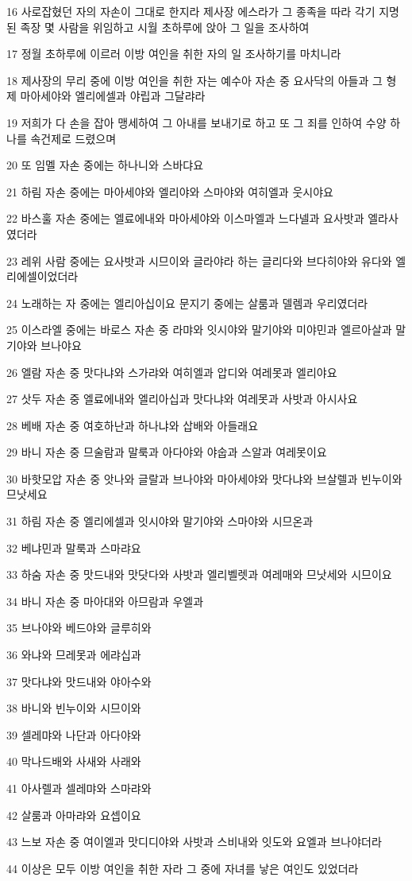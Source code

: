 \par 16 사로잡혔던 자의 자손이 그대로 한지라 제사장 에스라가 그 종족을 따라 각기 지명된 족장 몇 사람을 위임하고 시월 초하루에 앉아 그 일을 조사하여
\par 17 정월 초하루에 이르러 이방 여인을 취한 자의 일 조사하기를 마치니라
\par 18 제사장의 무리 중에 이방 여인을 취한 자는 예수아 자손 중 요사닥의 아들과 그 형제 마아세야와 엘리에셀과 야립과 그달랴라
\par 19 저희가 다 손을 잡아 맹세하여 그 아내를 보내기로 하고 또 그 죄를 인하여 수양 하나를 속건제로 드렸으며
\par 20 또 임멜 자손 중에는 하나니와 스바댜요
\par 21 하림 자손 중에는 마아세야와 엘리야와 스마야와 여히엘과 웃시야요
\par 22 바스훌 자손 중에는 엘료에내와 마아세야와 이스마엘과 느다넬과 요사밧과 엘라사였더라
\par 23 레위 사람 중에는 요사밧과 시므이와 글라야라 하는 글리다와 브다히야와 유다와 엘리에셀이었더라
\par 24 노래하는 자 중에는 엘리아십이요 문지기 중에는 살룸과 델렘과 우리였더라
\par 25 이스라엘 중에는 바로스 자손 중 라먀와 잇시야와 말기야와 미야민과 엘르아살과 말기야와 브나야요
\par 26 엘람 자손 중 맛다냐와 스가랴와 여히엘과 압디와 여레못과 엘리야요
\par 27 삿두 자손 중 엘료에내와 엘리아십과 맛다냐와 여레못과 사밧과 아시사요
\par 28 베배 자손 중 여호하난과 하나냐와 삽배와 아들래요
\par 29 바니 자손 중 므술람과 말룩과 아다야와 야숩과 스알과 여레못이요
\par 30 바핫모압 자손 중 앗나와 글랄과 브나야와 마아세야와 맛다냐와 브살렐과 빈누이와 므낫세요
\par 31 하림 자손 중 엘리에셀과 잇시야와 말기야와 스마야와 시므온과
\par 32 베냐민과 말룩과 스마랴요
\par 33 하숨 자손 중 맛드내와 맛닷다와 사밧과 엘리벨렛과 여레매와 므낫세와 시므이요
\par 34 바니 자손 중 마아대와 아므람과 우엘과
\par 35 브나야와 베드야와 글루히와
\par 36 와냐와 므레못과 에랴십과
\par 37 맛다냐와 맛드내와 야아수와
\par 38 바니와 빈누이와 시므이와
\par 39 셀레먀와 나단과 아다야와
\par 40 막나드배와 사새와 사래와
\par 41 아사렐과 셀레먀와 스마랴와
\par 42 살룸과 아마랴와 요셉이요
\par 43 느보 자손 중 여이엘과 맛디디야와 사밧과 스비내와 잇도와 요엘과 브나야더라
\par 44 이상은 모두 이방 여인을 취한 자라 그 중에 자녀를 낳은 여인도 있었더라



